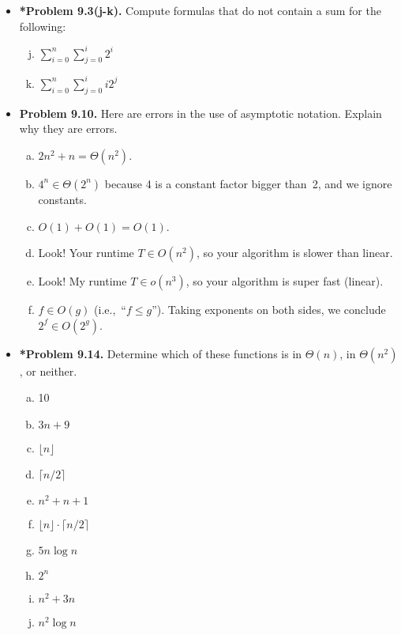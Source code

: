 \documentclass[11pt]{article}
\begin{document}
\begin{itemize}
\vspace{0.1in}

\item \textbf{*Problem 9.3(j-k).}
Compute formulas that do not contain a sum for the following:
\begin{multicols}{3}
\begin{enumerate}[(a)]
\setcounter{enumi}{9}
\item $\displaystyle \sum_{i=0}^n \sum_{j=0}^i 2^i$
\item $\displaystyle \sum_{i=0}^n \sum_{j=0}^i i2^j$
\end{enumerate}
\end{multicols}

\vspace{0.1in}

\item \textbf{Problem 9.10.}
Here are errors in the use of asymptotic notation.
Explain why they are errors.
\begin{enumerate}[(a)]
\item $2n^2+n=\Theta(n^2)$.
\item $4^n\in\Theta(2^n)$ because 4 is a constant factor bigger than~2,
  and we ignore constants.
\item $O(1)+O(1)=O(1)$.
\item Look!
  Your runtime $T\in O(n^2)$, so your algorithm is slower than linear.
\item Look!
  My runtime $T\in o(n^3)$, so your algorithm is super fast (linear).
\item $f\in O(g)$ (i.e.,~``$f\le g$'').
  Taking exponents on both sides, we conclude $2^f\in O(2^g)$.
\end{enumerate}

\vspace{0.1in}

\item \textbf{*Problem 9.14.}
Determine which of these functions is in $\Theta(n)$, in $\Theta(n^2)$, or neither.
\begin{multicols}{5}
\begin{enumerate}[(a)]
\item 10
\item $3n+9$
\item $\lfloor n\rfloor$
\item $\lceil n/2\rceil$
\item $n^2+n+1$
\item $\lfloor n\rfloor \cdot \lceil n/2\rceil$
\item $5n\log n$
\item $2^n$
\item $n^2+3n$
\item $n^2\log n$
\end{enumerate}
\end{multicols}


\end{itemize}
\end{document}
